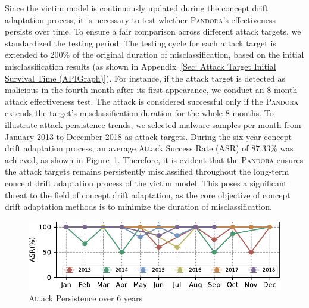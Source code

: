 \documentclass[lettersize,journal]{IEEEtran}
\newcommand{\pandora}{{\scshape Pandora}\xspace}
\begin{document}

Since the victim model is continuously updated during the concept drift adaptation process, it is necessary to test whether \pandora's effectiveness persists over time.
To ensure a fair comparison across different attack targets, we standardized the testing period.
The testing cycle for each attack target is extended to 200\% of the original duration of misclassification, based on the initial misclassification results (as shown in Appendix~\ref{Sec: Attack Target Initial Survival Time (APIGraph)}).
For instance, if the attack target is detected as malicious in the fourth month after its first appearance, we conduct an 8-month attack effectiveness test.
The attack is considered successful only if the \pandora extends the target’s misclassification duration for the whole 8 months.
To illustrate attack persistence trends, we selected malware samples per month from January 2013 to December 2018 as attack targets.
During the six-year concept drift adaptation process, an average Attack Success Rate (ASR) of 87.33\% was achieved, as shown in Figure~\ref{fig:Attack Persistence-APIGraph}.
Therefore, it is evident that the \pandora ensures the attack targets remains persistently misclassified throughout the long-term concept drift adaptation process of the victim model.
This poses a significant threat to the field of concept drift adaptation, as the core objective of concept drift adaptation methods is to minimize the duration of misclassification.
\begin{figure}[h!]
	\centering
	\includegraphics[width=\linewidth,keepaspectratio]{Graph/Evaluation/Figure9-update.pdf}
	\caption{Attack Persistence over 6 years }
	\label{fig:Attack Persistence-APIGraph}
\end{figure}
\end{document}
